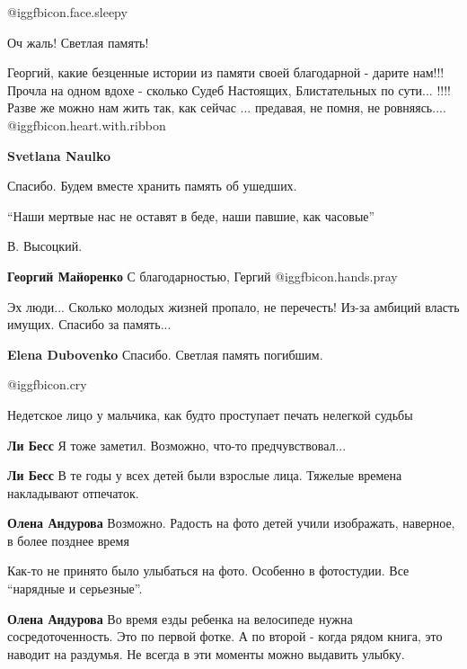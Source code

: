 \begin{itemize}
 @igg{fbicon.face.sleepy} 

Оч жаль! Светлая память!


Георгий, какие безценные истории из памяти своей благодарной - дарите нам!!!
Прочла на одном вдохе - сколько Судеб Настоящих, Блистательных по сути... !!!!
Разве же можно нам жить так, как сейчас ... предавая, не помня, не ровняясь....  @igg{fbicon.heart.with.ribbon} 

\begin{itemize} %
\textbf{Svetlana Naulko} 

Спасибо. Будем вместе хранить память об ушедших.

\enquote{Наши мертвые нас не оставят в беде,
наши павшие, как часовые}

В. Высоцкий.

\textbf{Георгий Майоренко} С благодарностью, Гергий @igg{fbicon.hands.pray} 
\end{itemize} %

Эх люди... Сколько молодых жизней пропало, не перечесть! Из-за амбиций власть имущих.
Спасибо за память...

\textbf{Elena Dubovenko} Спасибо. Светлая память погибшим.

 @igg{fbicon.cry} 

Недетское лицо у мальчика, как будто проступает печать нелегкой судьбы

\begin{itemize} %
\textbf{Ли Бесс} Я тоже заметил. Возможно, что-то предчувствовал...

\textbf{Ли Бесс} В те годы у всех детей были взрослые лица. Тяжелые времена накладывают отпечаток.

\begin{itemize} %
\textbf{Олена Андурова} Возможно. Радость на фото детей учили изображать, наверное, в более позднее время

Как-то не принято было улыбаться на фото. Особенно в фотостудии. Все \enquote{нарядные и серьезные}.

\textbf{Олена Андурова} Во время езды ребенка на велосипеде нужна сосредоточенность. Это по первой фотке. А по второй - когда рядом книга, это наводит на раздумья. Не всегда в эти моменты можно выдавить улыбку.
\end{itemize} %


\end{itemize}
\end{itemize}
